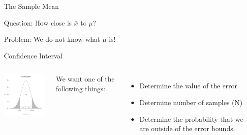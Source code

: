 \begin{frame}{The Sample Mean}


Question: How close is $\bar{x}$ to $\mu$? 

Problem: We do not know what $\mu$ is!
  
\end{frame}


\begin{frame}{Confidence Interval}

  \begin{columns}

    \centerline{\includegraphics[width=4cm]{img/confidenceInterval}}


    We want one of the following things:
    \begin{itemize}
    \item Determine the value of the error
    \item Determine number of samples (N)
    \item Determine the probability that we are outside of the error bounds.
    \end{itemize}

  \end{columns}
  
\end{frame}


